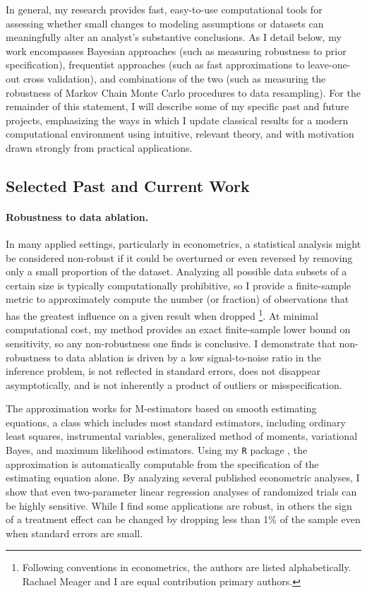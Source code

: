 In general, my research provides fast, easy-to-use computational tools for
assessing whether small changes to modeling assumptions or datasets can
meaningfully alter an analyst's substantive conclusions.  As I detail below, my
work encompasses Bayesian approaches (such as measuring robustness to prior
specification), frequentist approaches (such as fast approximations to
leave-one-out cross validation), and combinations of the two (such as measuring
the robustness of Markov Chain Monte Carlo procedures to data resampling). For
the remainder of this statement, I will describe some of my specific past and
future projects, emphasizing the ways in which I update classical results for a
modern computational environment using intuitive, relevant theory, and with
motivation drawn strongly from practical applications.

\subsection*{Selected Past and Current Work}

\paragraph{Robustness to data ablation.}
%
In many applied settings, particularly in econometrics, a statistical analysis
might be considered non-robust if it could be overturned or even reversed by
removing only a small proportion of the dataset. Analyzing all possible data
subsets of a certain size is typically computationally prohibitive, so I provide
a finite-sample metric to approximately compute the number (or fraction) of
observations that has the greatest influence on a given result when dropped
\citep{giordano:2020:amip}\footnote{Following conventions in econometrics, the
authors are listed alphabetically.  Rachael Meager and I are equal contribution
primary authors.}.  At minimal computational cost, my method provides an exact
finite-sample lower bound on sensitivity, so any non-robustness one finds is
conclusive. I demonstrate that non-robustness to data ablation is driven by a
low signal-to-noise ratio in the inference problem, is not reflected in standard
errors, does not disappear asymptotically, and is not inherently a product of
outliers or misspecification.

The approximation works for M-estimators based on smooth estimating equations, a
class which includes most standard estimators, including ordinary least squares,
instrumental variables, generalized method of moments, variational Bayes, and
maximum likelihood estimators. Using my \texttt{R} package \citep{zaminfluence},
the approximation is automatically computable from the specification of the
estimating equation alone.  By analyzing several published econometric analyses,
I show that even two-parameter linear regression analyses of randomized trials
can be highly sensitive.  While I find some applications are robust, in others
the sign of a treatment effect can be changed by dropping less than 1\% of the
sample even when standard errors are small.



